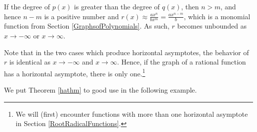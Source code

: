 \documentclass{ximera}
\begin{document}
If the degree of $p(x)$ is greater than the degree of $q(x)$, then $n > m$, and hence $n-m$ is a positive number and $r(x) \approx  \frac{ax^n}{bx^m}  = \frac{ax^{n-m}}{ b}$, which is a monomial function from Section \ref{GraphsofPolynomials}.  As such, $r$ becomes unbounded as $x \rightarrow -\infty$ or $x \rightarrow \infty$.

Note that in the two cases which produce horizontal asymptotes, the behavior of $r$ is identical as $x \rightarrow -\infty$ and $x \rightarrow \infty$.  Hence, if the graph of a rational function has a horizontal asymptote, there is only one.\footnote{We will (first) encounter functions with more than one horizontal asymptote in Section \ref{RootRadicalFunctions}.} 

We put Theorem \ref{hathm}  to good use in the following example.
 
\end{document}
